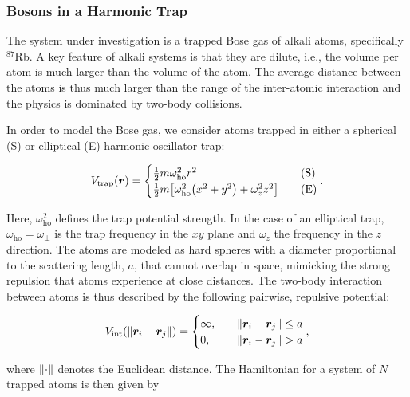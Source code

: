 \subsubsection{Bosons in a Harmonic Trap}

The system under investigation is a trapped Bose gas of alkali atoms, specifically $^{87}$Rb. A key feature of alkali systems is that they are dilute, i.e., the volume per atom is much larger than the volume of the atom. The average distance between the atoms is thus much larger than the range of the inter-atomic interaction and the physics is dominated by two-body collisions. 

In order to model the Bose gas, we consider atoms trapped in either a spherical (S) or elliptical (E) harmonic oscillator trap: 

\begin{equation}\label{eq:Vtrap}
    V_\mathrm{trap} \qty(\bm{r}) = 
    \begin{cases}
        \frac{1}{2} m \omega_\mathrm{ho}^2 r^2 \quad &\text{(S)}
        \\
        \frac{1}{2} m \qty[\omega_\mathrm{ho}^2 \qty(x^2 + y^2) + \omega_z^2 z^2] \quad &\text{(E)}
    \end{cases}.
\end{equation}

Here, $\omega_\mathrm{ho}^2$ defines the trap potential strength. In the case of an elliptical trap, $\omega_\mathrm{ho}=\omega_\perp$ is the trap frequency in the $xy$ plane and $\omega_z$ the frequency in the $z$ direction. The atoms are modeled as hard spheres with a diameter proportional to the scattering length, $a$, that cannot overlap in space, mimicking the strong repulsion that atoms experience at close distances. The two-body interaction between atoms is thus described by the following pairwise, repulsive potential:

\begin{equation}\label{eq:Vint}
    V_\mathrm{int} \qty(\norm{\bm{r}_i - \bm{r}_j}) = 
    \begin{cases}
        \infty, \quad &\norm{\bm{r}_i - \bm{r}_j} \leq a
        \\
        0, \quad &\norm{\bm{r}_i - \bm{r}_j} > a
    \end{cases},
\end{equation}

where $\norm{\cdot}$ denotes the Euclidean distance. The Hamiltonian for a system of $N$ trapped atoms is then given by


